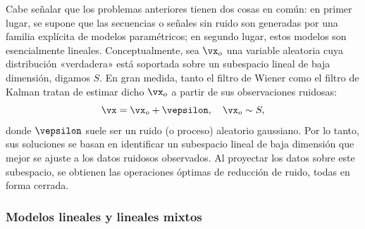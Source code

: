 \documentclass[../../book-main_es.tex]{subfiles}
\begin{document}
Cabe señalar que los problemas anteriores tienen dos cosas en común: en primer 
lugar, se supone que las secuencias o señales sin ruido son generadas por una
familia explícita de modelos paramétricos; en segundo lugar, estos modelos son
esencialmente lineales. Conceptualmente, sea \(\vx_{o}\) una variable aleatoria
cuya distribución «verdadera» está soportada sobre un subespacio lineal de baja dimensión, 
digamos \(S\). En gran medida, tanto el filtro de Wiener como el filtro de 
Kalman tratan de estimar dicho \(\vx_{o}\) a partir de sus observaciones ruidosas:
\begin{equation}
    \vx = \vx_{o} + \vepsilon, \quad \vx_{o} \sim S,
\end{equation}
donde \(\vepsilon\) suele ser un ruido (o proceso) aleatorio gaussiano.
Por lo tanto, sus soluciones se basan en identificar un subespacio lineal de baja 
dimensión que mejor se ajuste a los datos ruidosos observados.
Al proyectar los datos sobre este subespacio, se obtienen las
operaciones óptimas de reducción de ruido, todas en forma cerrada.

\subsubsection{Modelos lineales y lineales mixtos}
\label{sec:PCA-ICA}
\end{document}
